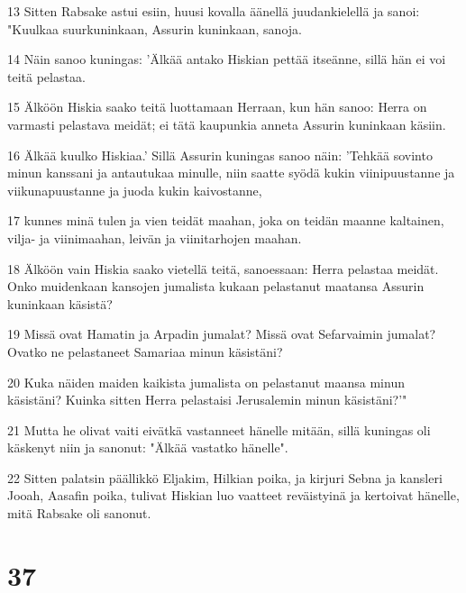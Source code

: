 \par 13 Sitten Rabsake astui esiin, huusi kovalla äänellä juudankielellä ja sanoi: "Kuulkaa suurkuninkaan, Assurin kuninkaan, sanoja.
\par 14 Näin sanoo kuningas: 'Älkää antako Hiskian pettää itseänne, sillä hän ei voi teitä pelastaa.
\par 15 Älköön Hiskia saako teitä luottamaan Herraan, kun hän sanoo: Herra on varmasti pelastava meidät; ei tätä kaupunkia anneta Assurin kuninkaan käsiin.
\par 16 Älkää kuulko Hiskiaa.' Sillä Assurin kuningas sanoo näin: 'Tehkää sovinto minun kanssani ja antautukaa minulle, niin saatte syödä kukin viinipuustanne ja viikunapuustanne ja juoda kukin kaivostanne,
\par 17 kunnes minä tulen ja vien teidät maahan, joka on teidän maanne kaltainen, vilja- ja viinimaahan, leivän ja viinitarhojen maahan.
\par 18 Älköön vain Hiskia saako vietellä teitä, sanoessaan: Herra pelastaa meidät. Onko muidenkaan kansojen jumalista kukaan pelastanut maatansa Assurin kuninkaan käsistä?
\par 19 Missä ovat Hamatin ja Arpadin jumalat? Missä ovat Sefarvaimin jumalat? Ovatko ne pelastaneet Samariaa minun käsistäni?
\par 20 Kuka näiden maiden kaikista jumalista on pelastanut maansa minun käsistäni? Kuinka sitten Herra pelastaisi Jerusalemin minun käsistäni?'"
\par 21 Mutta he olivat vaiti eivätkä vastanneet hänelle mitään, sillä kuningas oli käskenyt niin ja sanonut: "Älkää vastatko hänelle".
\par 22 Sitten palatsin päällikkö Eljakim, Hilkian poika, ja kirjuri Sebna ja kansleri Jooah, Aasafin poika, tulivat Hiskian luo vaatteet reväistyinä ja kertoivat hänelle, mitä Rabsake oli sanonut.

\chapter{37}

